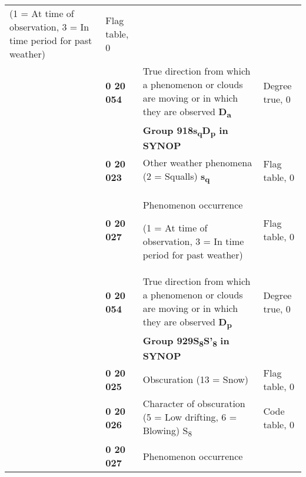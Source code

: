 \begin{longtable}[]{@{}llll@{}}
\begin{minipage}[t]{0.22\columnwidth}
(1 = At time of observation, 3 = In time period for past weather)\strut
\end{minipage} & \begin{minipage}[t]{0.22\columnwidth}\raggedright
Flag table, 0\strut
\end{minipage}\tabularnewline
& \textbf{0 20 054} & True direction from which a phenomenon or clouds are moving or in which they are observed \textbf{D\textsubscript{a}} & Degree true, 0\tabularnewline
& & \textbf{Group 918s\textsubscript{q}D\textsubscript{p} in SYNOP} &\tabularnewline
& \textbf{0 20 023} & Other weather phenomena (2 = Squalls) \textbf{s\textsubscript{q}} & Flag table, 0\tabularnewline
\begin{minipage}[t]{0.22\columnwidth}\raggedright
\strut
\end{minipage} & \begin{minipage}[t]{0.22\columnwidth}\raggedright
\textbf{0 20 027}\strut
\end{minipage} & \begin{minipage}[t]{0.22\columnwidth}\raggedright
Phenomenon occurrence

(1 = At time of observation, 3 = In time period for past weather)\strut
\end{minipage} & \begin{minipage}[t]{0.22\columnwidth}\raggedright
Flag table, 0\strut
\end{minipage}\tabularnewline
& \textbf{0 20 054} & True direction from which a phenomenon or clouds are moving or in which they are observed \textbf{D\textsubscript{p}} & Degree true, 0\tabularnewline
& & \textbf{Group 929S\textsubscript{8}S'\textsubscript{8}} \textbf{in SYNOP} &\tabularnewline
& \textbf{0 20 025} & Obscuration (13 = Snow) & Flag table, 0\tabularnewline
& \textbf{0 20 026} & Character of obscuration (5 = Low drifting, 6 = Blowing) S\textsubscript{8} & Code table, 0\tabularnewline
\begin{minipage}[t]{0.22\columnwidth}\raggedright
\strut
\end{minipage} & \begin{minipage}[t]{0.22\columnwidth}\raggedright
\textbf{0 20 027}\strut
\end{minipage} & \begin{minipage}[t]{0.22\columnwidth}\raggedright
Phenomenon occurrence


\end{minipage}
\end{longtable}
